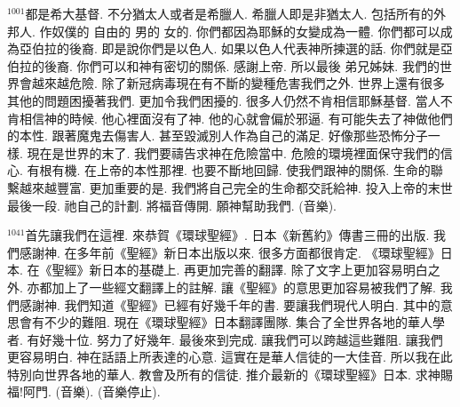 \documentclass{book}
\begin{document}
$^{1001}$都是希大基督.
不分猶太人或者是希臘人.
希臘人即是非猶太人.
包括所有的外邦人.
作奴僕的 自由的 男的 女的.
你們都因為耶穌的女變成為一體.
你們都可以成為亞伯拉的後裔.
即是說你們是以色人.
如果以色人代表神所揀選的話.
你們就是亞伯拉的後裔.
你們可以和神有密切的關係.
感謝上帝.
所以最後 弟兄姊妹.
我們的世界會越來越危險.
除了新冠病毒現在有不斷的變種危害我們之外.
世界上還有很多其他的問題困擾著我們.
更加令我們困擾的.
很多人仍然不肯相信耶穌基督.
當人不肯相信神的時候.
他心裡面沒有了神.
他的心就會偏於邪逼.
有可能失去了神做他們的本性.
跟著魔鬼去傷害人.
甚至毀滅別人作為自己的滿足.
好像那些恐怖分子一樣.
現在是世界的末了.
我們要禱告求神在危險當中.
危險的環境裡面保守我們的信心.
有根有機.
在上帝的本性那裡.
也要不斷地回歸.
使我們跟神的關係.
生命的聯繫越來越豐富.
更加重要的是.
我們將自己完全的生命都交託給神.
投入上帝的末世最後一段.
祂自己的計劃.
將福音傳開.
願神幫助我們.
(音樂).

$^{1041}$首先讓我們在這裡.
來恭賀《環球聖經》.
日本《新舊約》傳書三冊的出版.
我們感謝神.
在多年前《聖經》新日本出版以來.
很多方面都很肯定.
《環球聖經》日本.
在《聖經》新日本的基礎上.
再更加完善的翻譯.
除了文字上更加容易明白之外.
亦都加上了一些經文翻譯上的註解.
讓《聖經》的意思更加容易被我們了解.
我們感謝神.
我們知道《聖經》已經有好幾千年的書.
要讓我們現代人明白.
其中的意思會有不少的難阻.
現在《環球聖經》日本翻譯團隊.
集合了全世界各地的華人學者.
有好幾十位.
努力了好幾年.
最後來到完成.
讓我們可以跨越這些難阻.
讓我們更容易明白.
神在話語上所表達的心意.
這實在是華人信徒的一大佳音.
所以我在此特別向世界各地的華人.
教會及所有的信徒.
推介最新的《環球聖經》日本.
求神賜福!阿門.
(音樂).
(音樂停止).
\newpage
\end{document}
